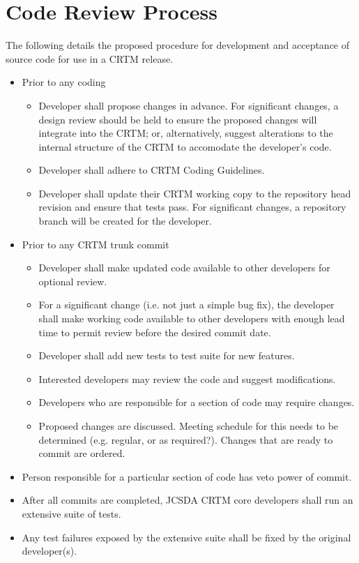 \section{Code Review Process}
\label{sec:code_review_process}
The following details the proposed procedure for development and acceptance of source code for use in a CRTM release.
\begin{itemize}
  \item Prior to any coding
  \begin{itemize}
    \item Developer shall propose changes in advance. For significant changes, a design review should be held to ensure the proposed changes will integrate into the CRTM; or, alternatively, suggest alterations to the internal structure of the CRTM to accomodate the developer's code.
    \item Developer shall adhere to CRTM Coding Guidelines\cite{ref:crtm_coding_guidelines}.
    \item Developer shall update their CRTM working copy to the repository head revision and ensure that tests pass. For significant changes, a repository branch will be created for the developer.
  \end{itemize}
  \item Prior to any CRTM trunk commit
  \begin{itemize}
    \item Developer shall make updated code available to other developers for optional review.
    \item For a significant change (i.e. not just a simple bug fix), the developer shall make working code available to other developers with enough lead time to permit review before the desired commit date.
    \item Developer shall add new tests to test suite for new features.
    \item Interested developers may review the code and suggest modifications.
    \item Developers who are responsible for a section of code may require changes.
    \item Proposed changes are discussed. Meeting schedule for this needs to be determined (e.g. regular, or as required?). Changes that are ready to commit are ordered.
  \end{itemize}
  \item Person responsible for a particular section of code has veto power of commit.
  \item After all commits are completed, JCSDA CRTM core developers shall run an extensive suite of tests.
  \item Any test failures exposed by the extensive suite shall be fixed by the original developer(s).
\end{itemize}


